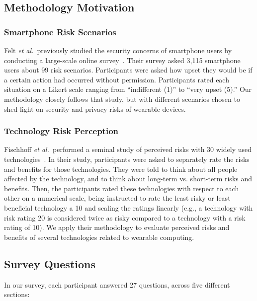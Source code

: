 \documentclass{acm_proc_article-sp}
\def\etal{{\it et al.~}}
\begin{document}
 

\subsection{Methodology Motivation}
\subsubsection{Smartphone Risk Scenarios}
Felt \etal previously studied the security concerns of smartphone users by conducting a large-scale online survey~\cite{Felt}. Their survey asked 3,115 smartphone users about 99 risk scenarios. Participants were asked how upset they would be if a certain action had occurred without permission. Participants rated each situation on a Likert scale ranging from ``indifferent (1)'' to ``very upset (5).''
Our methodology closely follows that study, but with different scenarios chosen to shed light on security and privacy risks of wearable devices.

\subsubsection{Technology Risk Perception}
Fischhoff \etal performed a seminal study of perceived risks with 30 widely used technologies~\cite{Fischhoff}. In their study, participants were asked to separately rate the risks and benefits for those technologies. They were told to think about all people affected by the technology, and to think about long-term vs. short-term risks and benefits. Then, the participants rated these technologies with respect to each other on a numerical scale, being instructed to rate the least risky or least beneficial technology a 10 and scaling the ratings linearly (e.g., a technology with risk rating 20 is considered twice as risky compared to a technology with a risk rating of 10).
We apply their methodology to evaluate perceived risks and benefits of several technologies related to wearable computing.



\subsection{Survey Questions}
In our survey, each participant answered 27 questions, across five different sections:   \\[-.8cm]
\end{document}
